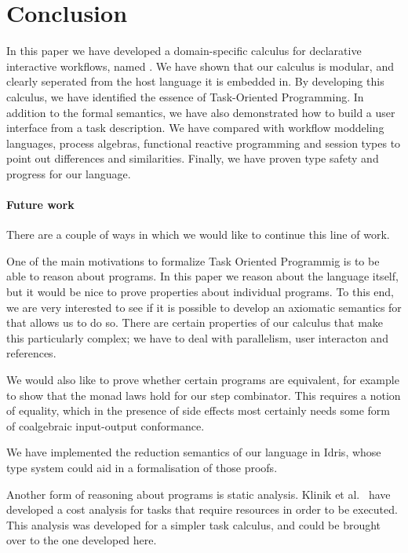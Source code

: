 
\section{Conclusion}

\label{sec:conclusions}

In this paper we have developed a domain-specific calculus for declarative interactive workflows, named \TOPHAT.
We have shown that our calculus is modular, and clearly seperated from the host language it is embedded in.
By developing this calculus, we have identified the essence of Task-Oriented Programming.
In addition to the formal semantics, we have also demonstrated how to build a user interface from a task description.
We have compared \TOPHAT with workflow moddeling languages, process algebras, functional reactive programming and session types to point out differences and similarities.
Finally, we have proven type safety and progress for our language.



\paragraph{Future work}

There are a couple of ways in which we would like to continue this line of work.

One of the main motivations to formalize Task Oriented Programmig is to be able to reason about programs.
In this paper we reason about the language itself, but it would be nice to prove properties about individual programs.
To this end, we are very interested to see if it is possible to develop an axiomatic semantics for \TOPHAT that allows us to do so.
There are certain properties of our calculus that make this particularly complex; we have to deal with parallelism, user interacton and references.

We would also like to prove whether certain programs are equivalent, for example to show that the monad laws hold for our step combinator.
This requires a notion of equality, which in the presence of side effects most certainly needs some form of coalgebraic input-output conformance.

We have implemented the reduction semantics of our language in Idris, whose type system could aid in a formalisation of those proofs.

Another form of reasoning about programs is static analysis.
Klinik et al.~\cite{conf/ifl/KlinikJP17} have developed a cost analysis for tasks that require resources in order to be executed.
This analysis was developed for a simpler task calculus, and could be brought over to the one developed here.

